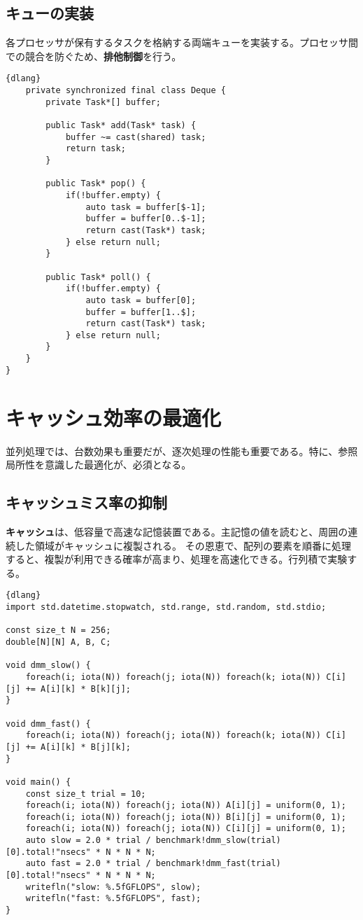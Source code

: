 \documentclass[10pt,a4paper]{book}
\begin{document}
\section{キューの実装}

各プロセッサが保有するタスクを格納する両端キューを実装する。プロセッサ間での競合を防ぐため、\textbf{排他制御}を行う。

\begin{Verbatim}{dlang}
	private synchronized final class Deque {
		private Task*[] buffer;

		public Task* add(Task* task) {
			buffer ~= cast(shared) task;
			return task;
		}

		public Task* pop() {
			if(!buffer.empty) {
				auto task = buffer[$-1];
				buffer = buffer[0..$-1];
				return cast(Task*) task;
			} else return null;
		}

		public Task* poll() {
			if(!buffer.empty) {
				auto task = buffer[0];
				buffer = buffer[1..$];
				return cast(Task*) task;
			} else return null;
		}
	}
}
\end{Verbatim}

\chapter{キャッシュ効率の最適化\label{chap:cache}}

並列処理では、台数効果も重要だが、逐次処理の性能も重要である。特に、参照局所性を意識した最適化が、必須となる。

\section{キャッシュミス率の抑制}

\textbf{キャッシュ}は、低容量で高速な記憶装置である。主記憶の値を読むと、周囲の連続した領域がキャッシュに複製される。
その恩恵で、配列の要素を順番に処理すると、複製が利用できる確率が高まり、処理を高速化できる。行列積で実験する。

\begin{Verbatim}{dlang}
import std.datetime.stopwatch, std.range, std.random, std.stdio;

const size_t N = 256;
double[N][N] A, B, C;

void dmm_slow() {
	foreach(i; iota(N)) foreach(j; iota(N)) foreach(k; iota(N)) C[i][j] += A[i][k] * B[k][j];
}

void dmm_fast() {
	foreach(i; iota(N)) foreach(j; iota(N)) foreach(k; iota(N)) C[i][j] += A[i][k] * B[j][k];
}

void main() {
	const size_t trial = 10;
	foreach(i; iota(N)) foreach(j; iota(N)) A[i][j] = uniform(0, 1);
	foreach(i; iota(N)) foreach(j; iota(N)) B[i][j] = uniform(0, 1);
	foreach(i; iota(N)) foreach(j; iota(N)) C[i][j] = uniform(0, 1);
	auto slow = 2.0 * trial / benchmark!dmm_slow(trial)[0].total!"nsecs" * N * N * N;
	auto fast = 2.0 * trial / benchmark!dmm_fast(trial)[0].total!"nsecs" * N * N * N;
	writefln("slow: %.5fGFLOPS", slow);
	writefln("fast: %.5fGFLOPS", fast);
}
\end{Verbatim}
\end{document}
